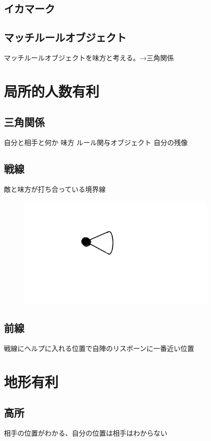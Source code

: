 \documentclass[a4paper,11pt]{jsbook}
\begin{document}
\subsection{イカマーク}
\subsection{マッチルールオブジェクト}
マッチルールオブジェクトを味方と考える。→三角関係

\section{局所的人数有利}
\subsection{三角関係}
自分と相手と何か
味方
ルール関与オブジェクト
自分の残像



\subsection{戦線}
敵と味方が打ち合っている境界線
\begin{figure}
  \begin{center}
    \includegraphics[width=10cm]{resoource/player.png}
  \end{center}
\end{figure}

\subsection{前線}
戦線にヘルプに入れる位置で自陣のリスボーンに一番近い位置

\section{地形有利}
\subsection{高所}
相手の位置がわかる、自分の位置は相手はわからない
\end{document}
